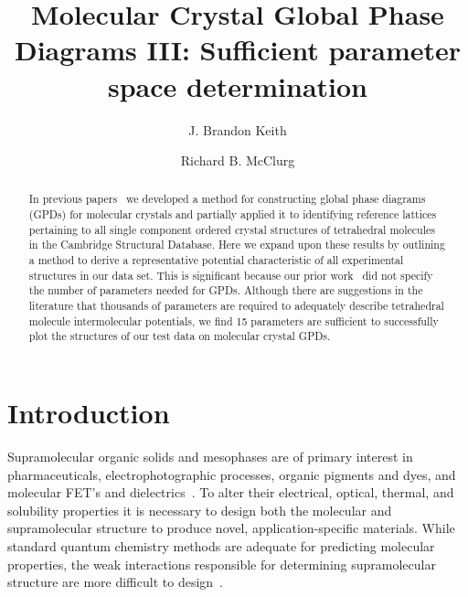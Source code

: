 \documentclass[preprint]{revtex4}
\begin{document}
\title{Molecular Crystal Global Phase Diagrams III: Sufficient parameter space determination}

\author{J. Brandon Keith}
\author{Richard B. McClurg}


\begin{abstract}
In previous papers~\cite{Mettes04,McClurg05} we developed a method
for constructing global phase diagrams (GPDs) for molecular crystals
and partially applied it to identifying reference lattices
pertaining to all single component ordered crystal structures of
tetrahedral molecules in the Cambridge Structural Database. Here we
expand upon these results by outlining a method to derive a
representative potential characteristic of all experimental
structures in our data set. This is significant because our prior
work~\cite{Mettes04} did not specify the number of parameters needed
for GPDs. Although there are suggestions in the literature that
thousands of parameters are required to adequately describe
tetrahedral molecule intermolecular potentials, we
find 15 parameters are sufficient to successfully plot the
structures of our test data on molecular crystal GPDs.
\end{abstract}

\maketitle

\section{Introduction}

Supramolecular organic solids and mesophases are of primary interest
in pharmaceuticals, electrophotographic processes, organic pigments
and dyes, and molecular FET's and dielectrics~\cite{Bassoul00}. To
alter their electrical, optical, thermal, and solubility properties
it is necessary to design both the molecular and supramolecular
structure to produce novel, application-specific materials. While
standard quantum chemistry methods are adequate for predicting
molecular properties, the weak interactions responsible for
determining supramolecular structure are more difficult to
design~\cite{Lommerse00,Motherwell02}.
\end{document}
